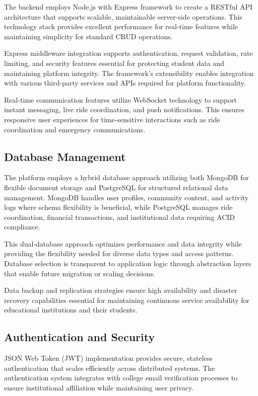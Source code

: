 \documentclass[conference]{IEEEtran}
\begin{document}
The backend employs Node.js with Express framework to create a RESTful API architecture that supports scalable, maintainable server-side operations. This technology stack provides excellent performance for real-time features while maintaining simplicity for standard CRUD operations.

Express middleware integration supports authentication, request validation, rate limiting, and security features essential for protecting student data and maintaining platform integrity. The framework's extensibility enables integration with various third-party services and APIs required for platform functionality.

Real-time communication features utilize WebSocket technology to support instant messaging, live ride coordination, and push notifications. This ensures responsive user experiences for time-sensitive interactions such as ride coordination and emergency communications.

\subsection{Database Management}

The platform employs a hybrid database approach utilizing both MongoDB for flexible document storage and PostgreSQL for structured relational data management. MongoDB handles user profiles, community content, and activity logs where schema flexibility is beneficial, while PostgreSQL manages ride coordination, financial transactions, and institutional data requiring ACID compliance.

This dual-database approach optimizes performance and data integrity while providing the flexibility needed for diverse data types and access patterns. Database selection is transparent to application logic through abstraction layers that enable future migration or scaling decisions.

Data backup and replication strategies ensure high availability and disaster recovery capabilities essential for maintaining continuous service availability for educational institutions and their students.

\subsection{Authentication and Security}

JSON Web Token (JWT) implementation provides secure, stateless authentication that scales efficiently across distributed systems. The authentication system integrates with college email verification processes to ensure institutional affiliation while maintaining user privacy.
\end{document}
